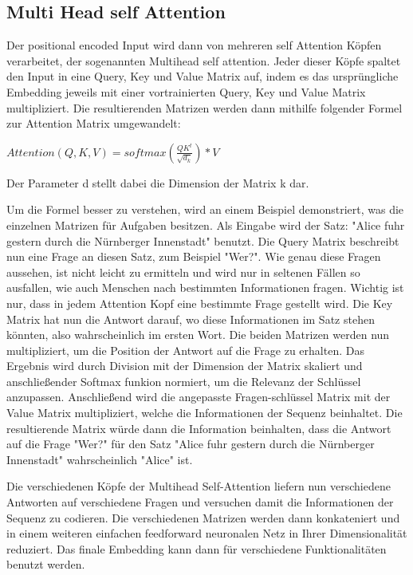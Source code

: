 \subsection{Multi Head self Attention}

Der positional encoded Input wird dann von mehreren self Attention Köpfen verarbeitet, der sogenannten Multihead self attention. 
Jeder dieser Köpfe spaltet den Input in eine Query, Key und Value Matrix auf, indem es das ursprüngliche Embedding jeweils mit einer vortrainierten Query, Key und Value Matrix multipliziert.
Die resultierenden Matrizen werden dann mithilfe folgender Formel zur Attention Matrix umgewandelt:

$Attention(Q,K,V)=softmax(\frac{QK^t}{\sqrt{d_k}})*V$

Der Parameter d stellt dabei die Dimension der Matrix k dar.

Um die Formel besser zu verstehen, wird an einem Beispiel demonstriert, was die einzelnen Matrizen für Aufgaben besitzen.
Als Eingabe wird der Satz: "Alice fuhr gestern durch die Nürnberger Innenstadt" benutzt.
Die Query Matrix beschreibt nun eine Frage an diesen Satz, zum Beispiel "Wer?".
Wie genau diese Fragen aussehen, ist nicht leicht zu ermitteln und wird nur in seltenen Fällen so ausfallen, wie auch Menschen nach bestimmten Informationen fragen.
Wichtig ist nur, dass in jedem Attention Kopf eine bestimmte Frage gestellt wird.
Die Key Matrix hat nun die Antwort darauf, wo diese Informationen im Satz stehen könnten, also wahrscheinlich im ersten Wort. 
Die beiden Matrizen werden nun multipliziert, um die Position der Antwort auf die Frage zu erhalten. 
Das Ergebnis wird durch Division mit der Dimension der Matrix skaliert und anschließender Softmax funkion normiert, um die Relevanz der Schlüssel anzupassen.
Anschließend wird die angepasste Fragen-schlüssel Matrix mit der Value Matrix multipliziert, welche die Informationen der Sequenz beinhaltet. 
Die resultierende Matrix würde dann die Information beinhalten, dass die Antwort auf die Frage "Wer?" für den Satz "Alice fuhr gestern durch die Nürnberger Innenstadt" wahrscheinlich "Alice" ist.

Die verschiedenen Köpfe der Multihead Self-Attention liefern nun verschiedene Antworten auf verschiedene Fragen und versuchen damit die Informationen der Sequenz zu codieren.
Die verschiedenen Matrizen werden dann konkateniert und in einem weiteren einfachen feedforward neuronalen Netz in Ihrer Dimensionalität reduziert.
Das finale Embedding kann dann für verschiedene Funktionalitäten benutzt werden.


